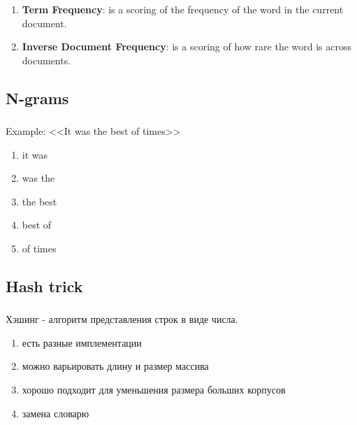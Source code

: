 \documentclass[t, 11pt]{beamer}
\begin{document}
		
\begin{frame} \label{}
	\frametitle{\insertsection}
	\frametitle{\insertsubsection}
	
	\begin{enumerate}

\item \textbf{Term Frequency}: is a scoring of the frequency of the word in the current document.
\item \textbf{Inverse Document Frequency}: is a scoring of how rare the word is across documents.

	\end{enumerate}



\end{frame}

			\subsection{N-grams}
	\begin{frame}\label{l5}
		\frametitle{\insertsection}
		\frametitle{\insertsubsection}
		Example: <<It was the best of times>>
		\begin{enumerate}
			\item it was
			\item was the  
			\item the best
			\item best of
			\item of times
		\end{enumerate}
	\end{frame}
	
	
	
			\subsection{Hash trick}
\begin{frame} 
	\frametitle{\insertsection}
	\frametitle{\insertsubsection}
Хэшинг - алгоритм представления строк в виде числа. 
	\begin{enumerate}
		\item есть разные имплементации
		\item можно варьировать длину и размер массива
		\item хорошо подходит для уменьшения размера больших корпусов
		\item замена словарю
	\end{enumerate}
\end{frame}
\end{document}
